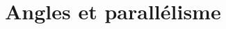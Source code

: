 \documentclass[a4paper,10pt]{article}
\begin{document}
\section{Angles et parallélisme}

\begin{multicols}{2}
\end{multicols}
\end{document}
